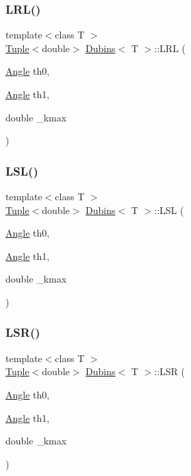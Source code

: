 \subsubsection{\texorpdfstring{LRL()}{LRL()}}
{\footnotesize\ttfamily template$<$class T $>$ \\
\mbox{\hyperlink{class_tuple}{Tuple}}$<$double$>$ \mbox{\hyperlink{class_dubins}{Dubins}}$<$ T $>$\+::L\+RL (\begin{DoxyParamCaption}\item[{\mbox{\hyperlink{class_angle}{Angle}}}]{th0,  }\item[{\mbox{\hyperlink{class_angle}{Angle}}}]{th1,  }\item[{double}]{\+\_\+kmax }\end{DoxyParamCaption})\hspace{0.3cm}{\ttfamily [inline]}}

\mbox{\label{class_dubins_a5a153104d874036205068b703f03240a}} 
\subsubsection{\texorpdfstring{LSL()}{LSL()}}
{\footnotesize\ttfamily template$<$class T $>$ \\
\mbox{\hyperlink{class_tuple}{Tuple}}$<$double$>$ \mbox{\hyperlink{class_dubins}{Dubins}}$<$ T $>$\+::L\+SL (\begin{DoxyParamCaption}\item[{\mbox{\hyperlink{class_angle}{Angle}}}]{th0,  }\item[{\mbox{\hyperlink{class_angle}{Angle}}}]{th1,  }\item[{double}]{\+\_\+kmax }\end{DoxyParamCaption})\hspace{0.3cm}{\ttfamily [inline]}}

\mbox{\label{class_dubins_a5f2d7cc94c731253dee1c5b668ab2029}} 
\subsubsection{\texorpdfstring{LSR()}{LSR()}}
{\footnotesize\ttfamily template$<$class T $>$ \\
\mbox{\hyperlink{class_tuple}{Tuple}}$<$double$>$ \mbox{\hyperlink{class_dubins}{Dubins}}$<$ T $>$\+::L\+SR (\begin{DoxyParamCaption}\item[{\mbox{\hyperlink{class_angle}{Angle}}}]{th0,  }\item[{\mbox{\hyperlink{class_angle}{Angle}}}]{th1,  }\item[{double}]{\+\_\+kmax }\end{DoxyParamCaption})\hspace{0.3cm}{\ttfamily [inline]}}

